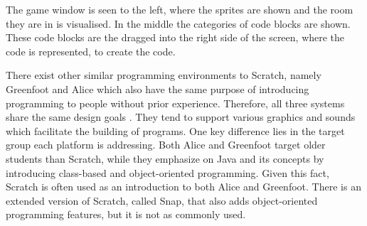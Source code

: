 
The game window is seen to the left, where the sprites are shown and the room they are in is visualised. In the middle the categories of code blocks are shown. These code blocks are the dragged into the right side of the screen, where the code is represented, to create the code.

There exist other similar programming environments to Scratch, namely Greenfoot and Alice which also have the same purpose of introducing programming to people without prior experience. Therefore, all three systems share the same design goals \cite{AliceGreenfootScratch}. They tend to support various graphics and sounds which facilitate the building of programs. One key difference lies in the target group each platform is addressing. Both Alice and Greenfoot target older students than Scratch, while they emphasize on Java and its concepts by introducing class-based and object-oriented programming. Given this fact, Scratch is often used as an introduction to both Alice and Greenfoot. There is an extended version of Scratch, called Snap, that also adds object-oriented programming features, but it is not as commonly used.


